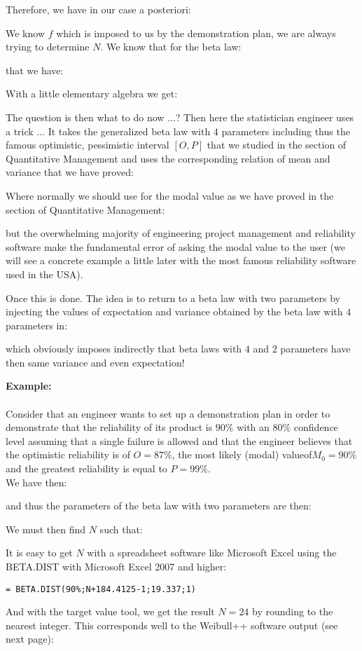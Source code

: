  	Therefore, we have in our case a posteriori:
	
 	We know $f$ which is imposed to us by the demonstration plan, we are always trying to determine $N$. We know that for the beta law:
	
 	that we have:
	
	With a little elementary algebra we get:
	
 	The question is then what to do now ...? Then here the statistician engineer uses a trick ... It takes the generalized beta law with $4$ parameters including thus the famous optimistic, pessimistic interval $[O, P]$ that we studied in the section of Quantitative Management and uses the corresponding relation of mean and variance that we have proved:
	
	Where normally we should use for the modal value as we have proved in the section of Quantitative Management:
	
	but the overwhelming majority of engineering project management and reliability software make the fundamental error of asking the modal value to the user (we will see a concrete example a little later with the most famous reliability software used in the USA).

	Once this is done. The idea is to return to a beta law with two parameters by injecting the values of expectation and variance obtained by the beta law with $4$ parameters in:
	
 	which obviously imposes indirectly that beta laws with $4$ and $2$ parameters have then same variance and even expectation!
	\begin{tcolorbox}[colframe=black,colback=white,sharp corners]
	\textbf{{\Large {}}Example:}\\\\
	Consider that an engineer wants to set up a demonstration plan in order to demonstrate that the reliability of its product is $90\%$ with an $80\%$ confidence level assuming that a single failure is allowed and that the engineer believes that the optimistic reliability is of $O=87\%$, the most likely (modal) valueof$M_0=90\%$ and the greatest reliability is equal to $P=99\%$.\\

	We have then:
	
	and thus the parameters of the beta law with two parameters are then:
	
	We must then find $N$ such that:
	
 	It is easy to get $N$ with a spreadsheet software like Microsoft Excel using the BETA.DIST with Microsoft Excel 2007 and higher:
	\begin{center}
	\texttt{= BETA.DIST(90\%;N+184.4125-1;19.337;1)}
	\end{center}
	And with the target value tool, we get the result $N=24$ by rounding to the nearest integer. This corresponds well to the Weibull++ software output (see next page):\\
	\end{tcolorbox}
	

